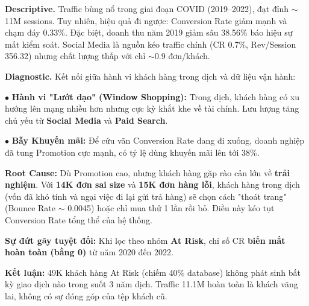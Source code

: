 \documentclass{article}
\begin{document}
\begin{flushleft} %
\noindent
\textbf{Descriptive.} Traffic bùng nổ trong giai đoạn COVID (2019–2022), đạt đỉnh $\sim$11M sessions. Tuy nhiên, hiệu quả đi ngược: Conversion Rate giảm mạnh và chạm đáy 0.33\%. Đặc biệt, doanh thu năm 2019 giảm sâu 38.56\% báo hiệu sự mất kiểm soát. Social Media là nguồn kéo traffic chính (CR 0.7\%, Rev/Session 356.32) nhưng chất lượng thấp với chỉ $\sim$0.9 đơn/khách.\par
\vspace{0.5em}

\noindent
\textbf{Diagnostic.} Kết nối giữa hành vi khách hàng trong dịch và dữ liệu vận hành:\par
\vspace{0.3em}

\noindent
$\bullet$ \textbf{Hành vi "Lướt dạo" (Window Shopping):} Trong dịch, khách hàng có xu hướng lên mạng nhiều hơn nhưng cực kỳ khắt khe về tài chính. Lưu lượng tăng chủ yếu từ \textbf{Social Media} và \textbf{Paid Search}.\par
\noindent
$\bullet$ \textbf{Bẫy Khuyến mãi:} Để cứu vãn Conversion Rate đang đi xuống, doanh nghiệp đã tung Promotion cực mạnh, có tỷ lệ dùng khuyến mãi lên tới 38\%.\par
\vspace{0.5em}

\noindent
\textbf{Root Cause:} Dù Promotion cao, nhưng khách hàng gặp rào cản lớn về \textbf{trải nghiệm}. Với \textbf{14K đơn sai size} và \textbf{15K đơn hàng lỗi}, khách hàng trong dịch (vốn đã khó tính và ngại việc đi lại gửi trả hàng) sẽ chọn cách "thoát trang" (Bounce Rate $\sim$ 0.0045) hoặc chỉ mua thử 1 lần rồi bỏ. Điều này kéo tụt Conversion Rate tổng thể của hệ thống.\par
\vspace{0.3em}

\noindent
\textbf{Sự đứt gãy tuyệt đối:} Khi lọc theo nhóm \textbf{At Risk}, chỉ số CR \textbf{biến mất hoàn toàn (bằng 0)} từ năm 2020 đến 2022.\par
\vspace{0.3em}

\noindent
\textbf{Kết luận:} 49K khách hàng At Risk (chiếm 40\% database) không phát sinh bất kỳ giao dịch nào trong suốt 3 năm dịch. Traffic 11.1M hoàn toàn là khách vãng lai, không có sự đóng góp của tệp khách cũ.\par
\vspace{0.3em}


\end{flushleft}
\end{document}
